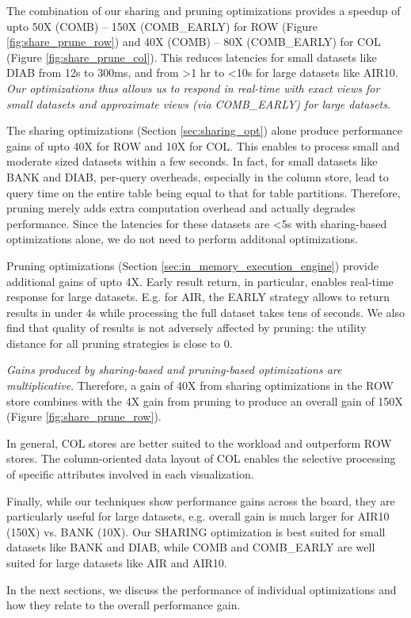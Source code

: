 \begin{denselist} 
\item The combination of our sharing and pruning optimizations provides a speedup of upto 50X (COMB) -- 150X (COMB\_EARLY) for ROW (Figure \ref{fig:share_prune_row}) and 40X (COMB) -- 80X (COMB\_EARLY) for COL (Figure \ref{fig:share_prune_col}).
This reduces latencies for small datasets like DIAB from 12s to 300ms, and from >1 hr to <10s for large datasets like AIR10. 
{\it Our optimizations thus allows us to respond in real-time with exact views for small datasets and approximate views (via COMB\_EARLY) for large datasets}.
\item The sharing optimizations (Section \ref{sec:sharing_opt}) alone produce performance gains of upto 40X for ROW and 10X for COL. This enables \SeeDB to process small and moderate sized datasets within a few seconds.
In fact, for small datasets like BANK and DIAB, per-query overheads, especially in the column store, lead to query time on the entire table being equal to that for table partitions.
Therefore, pruning merely adds extra computation overhead and actually degrades performance.
Since the latencies for these datasets are <5s with sharing-based optimizations alone, we do not need to perform additonal optimizations.
\item Pruning optimizations (Section \ref{sec:in_memory_execution_engine}) provide additional gains of upto 4X. Early result return, in particular, enables real-time response for large datasets. E.g. for AIR, the EARLY strategy allows \SeeDB to return results in under 4s while processing the full dataset takes tens of seconds. We also find that quality of results is not adversely affected by pruning: the utility distance for all pruning strategies is close to 0.
\item {\it Gains produced by sharing-based and pruning-based optimizations are multiplicative}. Therefore, a gain of 40X from sharing optimizations in the ROW store combines with the 4X gain from pruning to produce an overall gain of 150X (Figure \ref{fig:share_prune_row}).
\item In general, COL stores are better suited to the \SeeDB workload and outperform ROW stores. The column-oriented data layout of COL enables the selective processing of specific attributes involved in each visualization. 
\item Finally, while our techniques show performance gains across the board, they are particularly useful for large datasets, e.g. overall gain is much larger for AIR10 (150X) vs. BANK (10X). Our SHARING optimization is best suited for small datasets like BANK and DIAB, while COMB and COMB\_EARLY are well suited for large datasets like AIR and AIR10.
\end{denselist}



In the next sections, we discuss the performance of individual optimizations and how they relate to the overall performance gain.



